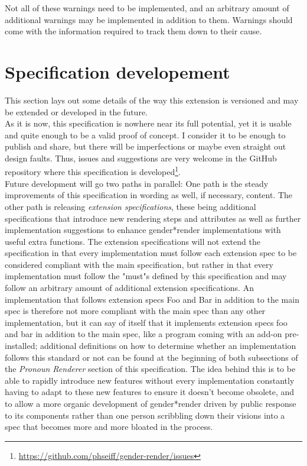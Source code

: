 \documentclass{article}
\newcommand{\GenderRender}{
    gender*render
}
\begin{document}
    Not all of these warnings need to be implemented, and an arbitrary amount of additional warnings may be implemented in addition to them.
    Warnings should come with the information required to track them down to their cause.

\section{Specification developement}

    This section lays out some details of the way this extension is versioned and may be extended or developed in the future.\\

    As it is now, this specification is nowhere near its full potential, yet it is usable and quite enough to be a valid proof of concept.
    I consider it to be enough to publish and share, but there will be imperfections or maybe even straight out design faults.
    Thus, issues and suggestions are very welcome in the GitHub repository where this specification is developed\footnote{\url{https://github.com/phseiff/gender-render/issues}}.\\

    Future development will go two paths in parallel: One path is the steady improvements of this specification in wording as well, if necessary, content.
    The other path is releasing \emph{extension specifications}, these being additional specifications that introduce new rendering steps and attributes as well as further implementation suggestions to enhance \GenderRender implementations with useful extra functions.
    The extension specifications will not extend the specification in that every implementation must follow each extension spec to be considered compliant with the main specification, but rather in that every implementation must follow the "must"s defined by this specification and may follow an arbitrary amount of additional extension specifications.
    An implementation that follows extension specs Foo and Bar in addition to the main spec is therefore not more compliant with the main spec than any other implementation, but it can say of itself that it implements extension specs foo and bar in addition to the main spec, like a program coming with an add-on pre-installed;
    additional definitions on how to determine whether an implementation follows this standard or not can be found at the beginning of both subsections of the \emph{Pronoun Renderer} section of this specification.
    The idea behind this is to be able to rapidly introduce new features without every implementation constantly having to adapt to these new features to ensure it doesn't become obsolete, and to allow a more organic development of \GenderRender driven by public response to its components rather than one person scribbling down their visions into a spec that becomes more and more bloated in the process.\\
\end{document}

